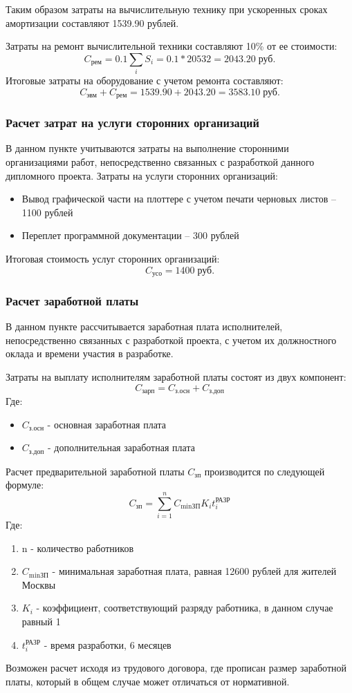 \documentclass[russian,utf8,emptystyle]{eskdtext}
\begin{document}
\begin{spacing}{1.5}
Таким образом затраты на вычислительную технику при ускоренных сроках амортизации составляют 1539.90 рублей.

Затраты на ремонт вычислительной техники составляют 10\% от ее стоимости:
$$
C_\text{рем} = 0.1 \sum_i S_i = 0.1 * 20532 = 2043.20 \; \text{руб.}
$$
Итоговые затраты на оборудование с учетом ремонта составляют:
$$
C_\text{эвм} + C_\text{рем} = 1539.90 + 2043.20 = 3583.10 \; \text{руб.}
$$

\subsubsection{Расчет затрат на услуги сторонних организаций}
В данном пункте учитываются затраты на выполнение сторонними организациями работ, непосредственно связанных с разработкой данного дипломного проекта.
Затраты на услуги сторонних организаций:
\begin{itemize}
\item Вывод графической части на плоттере с учетом печати черновых листов -- 1100 рублей
\item Переплет программной документации -- 300 рублей
\end{itemize}

Итоговая стоимость услуг сторонних организаций:
$$
C_\text{усо} = 1400 \; \text{руб.}
$$

\subsubsection{Расчет заработной платы}
В данном пункте рассчитывается заработная плата исполнителей, непосредственно связанных с разработкой проекта, с учетом их должностного оклада и времени участия в разработке. 

Затраты на выплату исполнителям заработной платы состоят из двух компонент:
$$
C_\text{зарп} = C_\text{з.осн} + C_\text{з.доп}
$$
Где:
\begin{itemize}
\item $C_\text{з.осн}$ - основная заработная плата
\item $C_\text{з.доп}$ - дополнительная заработная плата
\end{itemize}

Расчет предварительной заработной платы $C_\text{зп}$ производится по следующей формуле:
$$
C_\text{зп} = \sum_{i=1}^n C_\text{minЗП} K_i t_i^\text{РАЗР}
$$
Где:
\begin{enumerate}
\item n - количество работников
\item $C_\text{minЗП}$ - минимальная заработная плата, равная 12600 рублей для жителей Москвы
\item $K_i$ - коэффициент, соответствующий разряду работника, в данном случае равный 1
\item $t_i^\text{РАЗР}$ - время разработки, 6 месяцев
\end{enumerate}
Возможен расчет исходя из трудового договора, где прописан размер заработной платы, который в общем случае может отличаться от нормативной.


\end{spacing}
\end{document}
